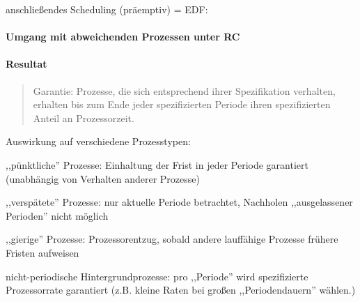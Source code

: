 \documentclass[a4paper]{article}
\begin{document}
\begin{multicols}{3}
    anschließendes Scheduling (präemptiv) = EDF:



    \paragraph{Umgang mit abweichenden Prozessen unter
        RC}



    \paragraph{Resultat}

    \begin{quote}
        Garantie: Prozesse, die sich entsprechend ihrer Spezifikation verhalten,
        erhalten bis zum Ende jeder spezifizierten Periode ihren spezifizierten
        Anteil an Prozessorzeit.
    \end{quote}

    Auswirkung auf verschiedene Prozesstypen:

    \begin{itemize*}
        \item
        ,,pünktliche'' Prozesse: Einhaltung der Frist in jeder Periode
        garantiert (unabhängig von Verhalten anderer Prozesse)
        \item
        ,,verspätete'' Prozesse: nur aktuelle Periode betrachtet, Nachholen
        ,,ausgelassener Perioden'' nicht möglich
        \item
        ,,gierige'' Prozesse: Prozessorentzug, sobald andere lauffähige
        Prozesse frühere Fristen aufweisen
        \item
        nicht-periodische Hintergrundprozesse: pro ,,Periode'' wird
        spezifizierte Prozessorrate garantiert (z.B. kleine Raten bei großen
        ,,Periodendauern'' wählen.)
    \end{itemize*}



\end{multicols}
\end{document}

